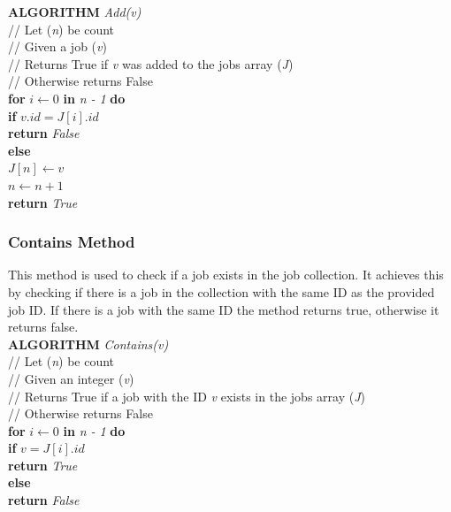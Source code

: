 \documentclass[12pt,a4paper]{article}
\begin{document}
				\textbf{ALGORITHM} \textit{Add(v)}\\
				\null\qquad\quad// Let (\textit{n}) be count\\
				\null\qquad\quad// Given a job (\textit{v})\\
				\null\qquad\quad// Returns True if \textit{v} was added to the jobs array (\textit{J})\\
				\null\qquad\quad// Otherwise returns False\\
				\null\qquad\quad\textbf{for} \textit{$i \gets 0$} \textbf{in} \textit{n - 1} \textbf{do}\\
				\null\qquad\qquad\textbf{if} \textit{$v.id = J[i].id$}\\
				\null\qquad\qquad\quad\textbf{return} \textit{False}\\
				\null\qquad\quad\textbf{else}\\
				\null\qquad\qquad\textit{$J[n] \gets v$}\\
				\null\qquad\qquad\textit{$n \gets n + 1$}\\
				\null\qquad\qquad\textbf{return} \textit{True}\\

			\subsubsection{Contains Method}
				This method is used to check if a job exists in the job collection. It achieves this by 
				checking if there is a job in the collection with the same ID as the provided job ID. If there is 
				a job with the same ID the method returns true, otherwise it returns false.\\

				\textbf{ALGORITHM} \textit{Contains(v)}\\
				\null\qquad\quad// Let (\textit{n}) be count\\
				\null\qquad\quad// Given an integer (\textit{v})\\
				\null\qquad\quad// Returns True if a job with the ID \textit{v} exists in the jobs array (\textit{J})\\
				\null\qquad\quad// Otherwise returns False\\
				\null\qquad\quad\textbf{for} \textit{$i \gets 0$} \textbf{in} \textit{n - 1} \textbf{do}\\
				\null\qquad\qquad\textbf{if} \textit{$v = J[i].id$}\\
				\null\qquad\qquad\quad\textbf{return} \textit{True}\\
				\null\qquad\quad\textbf{else}\\
				\null\qquad\qquad\textbf{return} \textit{False}
			
\end{document}

